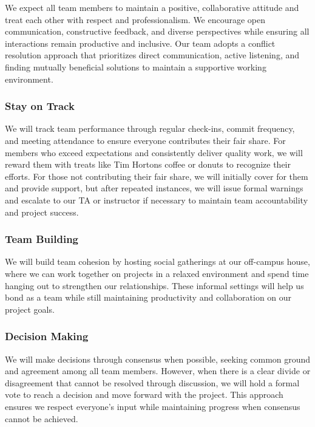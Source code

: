 \documentclass{article}
\begin{document}
We expect all team members to maintain a positive, collaborative attitude and
treat each other with respect and professionalism. We encourage open
communication, constructive feedback, and diverse perspectives while ensuring
all interactions remain productive and inclusive. Our team adopts a conflict
resolution approach that prioritizes direct communication, active listening, and
finding mutually beneficial solutions to maintain a supportive working
environment.

\subsubsection*{Stay on Track}

We will track team performance through regular check-ins, commit frequency, and
meeting attendance to ensure everyone contributes their fair share. For members
who exceed expectations and consistently deliver quality work, we will reward
them with treats like Tim Hortons coffee or donuts to recognize their efforts.
For those not contributing their fair share, we will initially cover for them
and provide support, but after repeated instances, we will issue formal warnings
and escalate to our TA or instructor if necessary to maintain team
accountability and project success.

\subsubsection*{Team Building}

We will build team cohesion by hosting social gatherings at our off-campus
house, where we can work together on projects in a relaxed environment and spend
time hanging out to strengthen our relationships. These informal settings will
help us bond as a team while still maintaining productivity and collaboration on
our project goals.

\subsubsection*{Decision Making} 

We will make decisions through consensus when possible, seeking common ground
and agreement among all team members. However, when there is a clear divide or
disagreement that cannot be resolved through discussion, we will hold a formal
vote to reach a decision and move forward with the project. This approach
ensures we respect everyone's input while maintaining progress when consensus
cannot be achieved.
\end{document}
